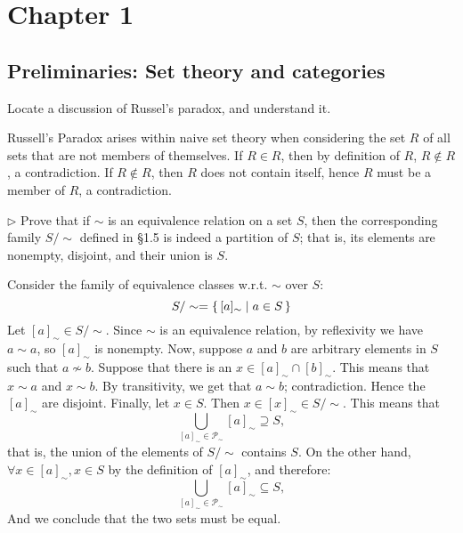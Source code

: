 \section*{Chapter 1}
\subsection*{Preliminaries: Set theory and categories}
\setcounter{subsection}{1}

\begin{problem}
  Locate a discussion of Russel's paradox, and understand it.
\end{problem}
\begin{solution}
  Russell's Paradox arises within naive set theory when considering the set
  $R$ of all sets that are not members of themselves. If $R \in R$, then by
  definition of $R$, $R \notin R$, a contradiction. If $R \notin R$, then $R$
  does not contain itself, hence $R$ must be a member of $R$,
  a contradiction.
\end{solution}

\begin{problem}
  $\rhd$ Prove that if $\sim$ is an equivalence relation on a set $S$, then
  the corresponding family $S/\sim$ defined in \S1.5 is indeed a
  partition of $S$; that is, its elements are nonempty, disjoint, and their
  union is $S$.
\end{problem}
\begin{solution}
  Consider the family of equivalence classes w.r.t. $\sim$ over $S$:
  \[ S/\sim = \left\{\,[a]_{\sim} \mid a\in S\,\right\} \]
  Let $[a]_{\sim}\in S/\sim$. Since $\sim$ is an equivalence relation,
  by reflexivity we have $a\sim a$, so $[a]_{\sim}$ is nonempty. Now, suppose
  $a$ and $b$ are arbitrary elements in $S$ such that $a\not\sim b$. Suppose
  that there is an $x\in [a]_{\sim}\cap[b]_{\sim}$. This means that $x\sim a$
  and $x\sim b$. By transitivity, we get that $a\sim b$; contradiction.
  Hence the $[a]_{\sim}$ are disjoint. Finally, let $x\in S$. Then
  $x\in[x]_{\sim}\in S/\sim$. This means that
  \[ \bigcup_{[a]_{\sim} \in \mathscr{P}_{\sim}} [a]_{\sim} \supseteq S, \]
  that is, the union of the elements of $S/\sim$ contains $S$.
  On the other hand, $\forall x \in [a]_\sim, x \in S$ by the definition
  of $[a]_\sim$, and therefore:
  \[ \bigcup_{[a]_{\sim} \in \mathscr{P}_{\sim}} [a]_{\sim} \subseteq S, \]
  And we conclude that the two sets must be equal.
\end{solution}

